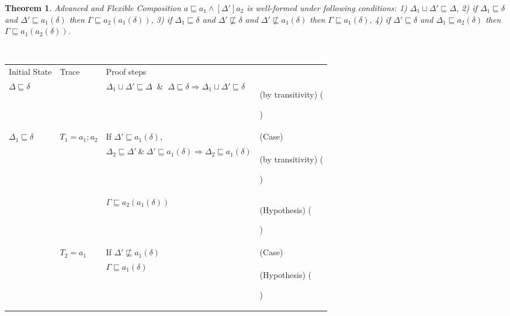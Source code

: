\documentclass[12pt,journal,letterpaper,onecolumn]{IEEEtran}
\newcounter{myCounter}
\renewcommand{\themyCounter}{\arabic{myCounter}\addtocounter{myCounter}{1}}
\newtheorem{theorem}{Theorem}[section]
\begin{document}
\begin{theorem}
Advanced and Flexible Composition $a\sqsubseteq
a_1\wedge[\Delta']a_2$ is well-formed under following conditions: 1)
$\Delta_1 \sqcup \Delta' \sqsubseteq  \Delta$, 2) if $\Delta_1
\sqsubseteq \delta$ and $\Delta' \sqsubseteq a_1(\delta)$ then
$\Gamma \sqsubseteq a_2(a_1(\delta))$, 3) if $\Delta_1 \sqsubseteq
\delta$ and $\Delta' \not \sqsubseteq \delta$ and $\Delta' \not
\sqsubseteq a_1(\delta)$ then $\Gamma \sqsubseteq a_1(\delta)$, 4)
if $\Delta' \sqsubseteq \delta$ and $\Delta_1 \sqsubseteq
a_2(\delta)$ then  $\Gamma \sqsubseteq a_1(a_2(\delta))$.
\label{theorem:advancedflexible} \end{theorem}
\\
\noindent
\begin{minipage}{6in} \begin{center}
\begin{tabular}{llp{6.3cm}p{3.8cm}}
Initial State & Trace &  Proof steps & \\
$\Delta \sqsubseteq \delta$ & & $\Delta_1 \sqcup \Delta' \sqsubseteq \Delta $ $~\&~$ $  \Delta \sqsubseteq \delta \Rightarrow \Delta_1\sqcup\Delta' \sqsubseteq \delta$ & (by transitivity) \hfill(\themyCounter)\\
$ \Delta_1 \sqsubseteq \delta$ & $T_1 = a_1;a_2$ & If $\Delta' \sqsubseteq a_1(\delta)$, & (Case)\\& & $\Delta_2\sqsubseteq\Delta'~\&~\Delta'\sqsubseteq a_1(\delta) \Rightarrow \Delta_2\sqsubseteq a_1(\delta)$ & (by transitivity) \hfill(\themyCounter) \\
& & $\Gamma \sqsubseteq a_2(a_1(\delta))$ & (Hypothesis) \hfill(\themyCounter) \\

& $T_2 = a_1$ & If $\Delta' \not \sqsubseteq a_1(\delta)$ & (Case) \\ & & $\Gamma \sqsubseteq a_1(\delta)$ & (Hypothesis) \hfill(\themyCounter)\\


\end{tabular}
\end{center}
\end{minipage}
\end{document}
